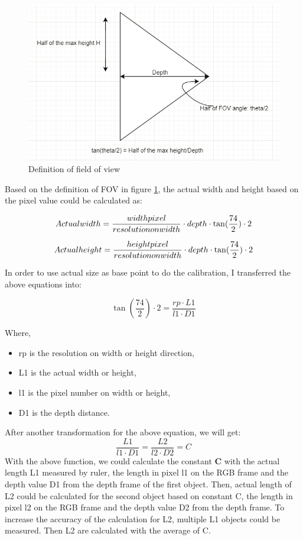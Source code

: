 \documentclass[
  oneside]{ubcthesis}
\providecommand{\tightlist}{%
  \setlength{\itemsep}{0pt}\setlength{\parskip}{0pt}}
\begin{document}
\begin{figure}

{\centering \includegraphics[width=0.9\linewidth]{figures/5} 

}

\caption{Definition of field of view}\label{fig:figure5}
\end{figure}



Based on the definition of FOV in figure \ref{fig:figure5}, the actual width and height based on the pixel value could be calculated as:

\[ Actual \space width = \frac{width \space pixel}{resolution \space on \space width} \cdot depth \cdot \tan(\frac{74}{2}) \cdot 2 \]

\[ Actual \space height = \frac{height \space pixel}{resolution \space on \space width} \cdot depth \cdot \tan(\frac{74}{2}) \cdot 2 \]

In order to use actual size as base point to do the calibration, I transferred the above equations into:

\[ \tan(\frac{74}{2}) \cdot 2 = \frac{rp \cdot L1}{l1 \cdot D1} \]

Where,

\begin{itemize}
\tightlist
\item
  rp is the resolution on width or height direction,
\item
  L1 is the actual width or height,
\item
  l1 is the pixel number on width or height,
\item
  D1 is the depth distance.
\end{itemize}

After another transformation for the above equation, we will get:
\[\frac{L1}{l1 \cdot D1} = \frac{L2}{l2 \cdot D2} = C\]
With the above function, we could calculate the constant \textbf{C} with the actual length L1 measured by ruler, the length in pixel l1 on the RGB frame and the depth value D1 from the depth frame of the first object. Then, actual length of L2 could be calculated for the second object based on constant C, the length in pixel l2 on the RGB frame and the depth value D2 from the depth frame. To increase the accuracy of the calculation for L2, multiple L1 objects could be measured. Then L2 are calculated with the average of C.
\end{document}
